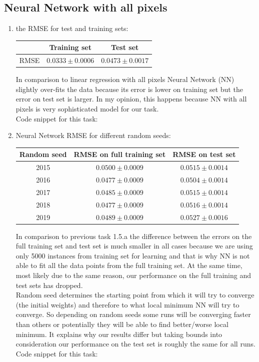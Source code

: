 \documentclass{article}
\begin{document}
		\subsection{Neural Network with all pixels}
			\begin{enumerate}[label=(\alph*)]
				\item
					the RMSE for test and training sets:
					\begin{center}
						\begin{tabular}{| c | c | c |}
							\hline
							\, & Training set & Test set \\ \hline
							RMSE  & $0.0333 \pm 0.0006$ & $0.0473 \pm 0.0017$ \\ 
							\hline
						\end{tabular}
					\end{center}
					In comparison to linear regression with all pixels Neural Network (NN) slightly over-fits the data because  its error is lower on training set but the error on test set is larger. In my opinion, this happens because NN with all pixels is very sophisticated model for our task.\\
					Code snippet for this task:
					
					
				\item
					Neural Network RMSE for different random seeds:
					\begin{center}
						\begin{tabular}{| c | c | c |}
							\hline
							Random seed & RMSE on full training set & RMSE on test set\\ \hline
							2015 & $0.0500 \pm 0.0009$ & $0.0515 \pm 0.0014$ \\ 
							2016 & $0.0477 \pm 0.0009$ & $0.0504 \pm 0.0014$ \\ 
							2017 & $0.0485 \pm 0.0009$ & $0.0515 \pm 0.0014$ \\ 
							2018 & $0.0477 \pm 0.0009$ & $0.0516 \pm 0.0014$ \\ 
							2019 & $0.0489 \pm 0.0009$ & $0.0527 \pm 0.0016$ \\
							\hline
						\end{tabular}
					\end{center}
					In comparison to previous task 1.5.a the difference between the errors on the full training set and test set is much smaller in all cases because we are using only 5000 instances from training set for learning and that is why NN is not able to fit all the data points from the full training set. At the same time, most likely due to the same reason, our performance on the full training and test sets has dropped. \\
					Random seed determines the starting point from which it will try to converge (the initial weights) and therefore to what local minimum NN will try to converge. So depending on random seeds some runs will be converging faster than others or potentially they will be able to find better/worse local minimum. It explains why our results differ but taking bounds into consideration our performance on the test set is roughly the same for all runs.\\
					Code snippet for this task:
					
			\end{enumerate}
\end{document}
